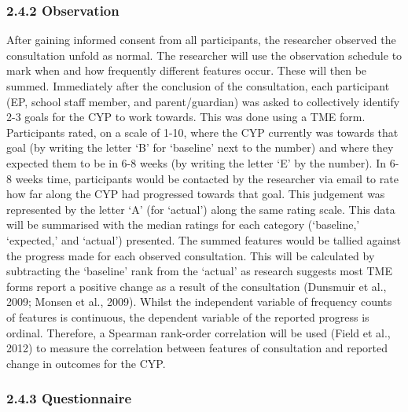\documentclass[
  english,
  man]{apa7}
\begin{document}
\hypertarget{observation-1}{%
\subsubsection{2.4.2 Observation}\label{observation-1}}

After gaining informed consent from all participants, the researcher observed the consultation unfold as normal. The researcher will use the observation schedule to mark when and how frequently different features occur. These will then be summed. Immediately after the conclusion of the consultation, each participant (EP, school staff member, and parent/guardian) was asked to collectively identify 2-3 goals for the CYP to work towards. This was done using a TME form. Participants rated, on a scale of 1-10, where the CYP currently was towards that goal (by writing the letter `B' for `baseline' next to the number) and where they expected them to be in 6-8 weeks (by writing the letter `E' by the number). In 6-8 weeks time, participants would be contacted by the researcher via email to rate how far along the CYP had progressed towards that goal. This judgement was represented by the letter `A' (for `actual') along the same rating scale. This data will be summarised with the median ratings for each category (`baseline,' `expected,' and `actual') presented. The summed features would be tallied against the progress made for each observed consultation. This will be calculated by subtracting the `baseline' rank from the `actual' as research suggests most TME forms report a positive change as a result of the consultation (Dunsmuir et al., 2009; Monsen et al., 2009). Whilst the independent variable of frequency counts of features is continuous, the dependent variable of the reported progress is ordinal. Therefore, a Spearman rank-order correlation will be used (Field et al., 2012) to measure the correlation between features of consultation and reported change in outcomes for the CYP.

\hypertarget{questionnaire-1}{%
\subsubsection{2.4.3 Questionnaire}\label{questionnaire-1}}
\end{document}
